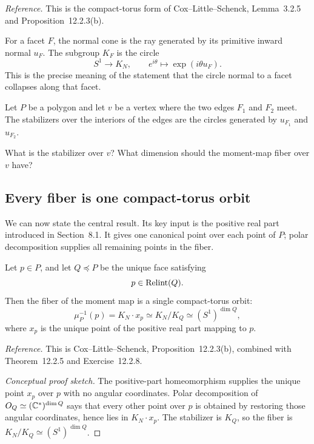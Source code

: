 \noindent
\textit{Reference.}
This is the compact-torus form of Cox--Little--Schenck,
Lemma~3.2.5 and Proposition~12.2.3(b).

For a facet \(F\), the normal cone is the ray generated by its
primitive inward normal \(u_F\). The subgroup \(K_F\) is the circle
\[
S^1\longrightarrow K_N,
\qquad
e^{i\theta}\longmapsto\exp(i\theta u_F).
\]
This is the precise meaning of the statement that the circle normal
to a facet collapses along that facet.

\begin{pauseandthink}
Let \(P\) be a polygon and let \(v\) be a vertex where the two edges
\(F_1\) and \(F_2\) meet. The stabilizers over the interiors of the
edges are the circles generated by \(u_{F_1}\) and \(u_{F_2}\).

What is the stabilizer over \(v\)? What dimension should the moment-map
fiber over \(v\) have?
\end{pauseandthink}

\subsection{Every fiber is one compact-torus orbit}

We can now state the central result. Its key input is the positive real
part introduced in Section~8.1. It gives one canonical point over each
point of \(P\); polar decomposition supplies all remaining points in
the fiber.

\begin{theorem}
\label{thm:moment-fibers-compact-orbits}
Let \(p\in P\), and let \(Q\preceq P\) be the unique face satisfying
\[
p\in\operatorname{Relint}(Q).
\]
Then the fiber of the moment map is a single compact-torus orbit:
\[
\boxed{
\mu_P^{-1}(p)=K_N\cdot x_p
\simeq K_N/K_Q
\simeq(S^1)^{\dim Q},
}
\]
where \(x_p\) is the unique point of the positive real part mapping to
\(p\).
\end{theorem}

\noindent
\textit{Reference.}
This is Cox--Little--Schenck, Proposition~12.2.3(b), combined with
Theorem~12.2.5 and Exercise~12.2.8.

\begin{proof}[Conceptual proof sketch]
The positive-part homeomorphism supplies the unique point \(x_p\) over
\(p\) with no angular coordinates. Polar decomposition of
\(O_Q\simeq(\mathbb{C}^*)^{\dim Q}\) says that every other point over \(p\)
is obtained by restoring those angular coordinates, hence lies in
\(K_N\cdot x_p\). The stabilizer is \(K_Q\), so the fiber is
\(K_N/K_Q\simeq(S^1)^{\dim Q}\).
\end{proof}

